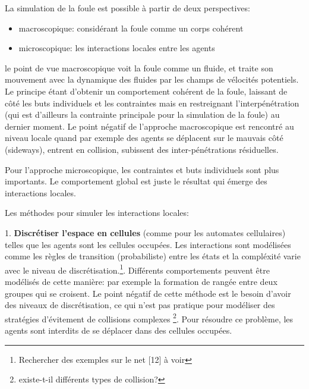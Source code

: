 \documentclass[11pt]{report}
\begin{document}
La simulation de la foule est possible à partir de deux perspectives:
\begin{itemize}
\item macroscopique: considérant la foule comme un corps cohérent
\item microscopique: les interactions locales entre les agents
\end{itemize}


le point de vue macroscopique voit la foule comme un fluide, et traite son mouvement avec la dynamique des fluides par les champs de vélocités potentiels. Le principe étant d'obtenir un comportement cohérent de la foule, laissant de côté les buts individuels et les contraintes mais en restreignant l'interpénétration (qui est d'ailleurs la contrainte principale pour la simulation de la foule) au dernier moment. Le point négatif de l'approche macroscopique est rencontré au niveau locale quand par exemple des agents se déplacent sur le mauvais côté (sideways), entrent en collision, subissent des inter-pénétrations résiduelles.

Pour l'approche microscopique, les contraintes et buts individuels sont plus importants. Le comportement global est juste le résultat qui émerge des interactions locales.

Les méthodes pour simuler les interactions locales:

1. \textbf{Discrétiser l'espace en cellules} (comme pour les automates cellulaires) telles que les agents sont les cellules occupées. Les interactions sont modélisées comme les règles de transition (probabiliste) entre les états et la compléxité varie avec le niveau de discrétisation.\footnote{Rechercher des exemples sur le net [12] à voir}. Différents comportements peuvent être modélisés de cette manière: par exemple la formation de rangée entre deux groupes qui se croisent. Le point négatif de cette méthode est le besoin d'avoir des niveaux de discrétisation, ce qui n'est pas pratique pour modéliser des stratégies d'évitement de collisions complexes \footnote{existe-t-il différents types de collision?}. Pour résoudre ce problème, les agents sont interdits de se déplacer dans des cellules occupées.
\end{document}
